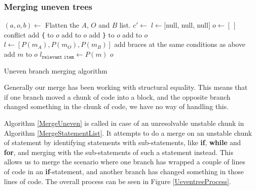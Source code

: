 \documentclass[11pt]{article}
\begin{document}
\subsubsection{Merging uneven trees}
\label{MergingUnevenSection}

\begin{algorithm}
\begin{algorithmic}
    \State $(a, o, b) \gets $ Flatten the $A$, $O$ and $B$ list.
    \State $c' \gets$ 
    \State $l \gets $[null, null, null$]$
    \State $o \gets [\,]$
        	        \State \Return conflict
				\EndIf
                	    \State add \texttt{\{} to $o$
    	            \EndIf
            	        \State add  to $o$
                    		\State add \texttt{\}} to $o$
	                    \EndIf
    	            \EndIf
				\EndIf
            	\State add  to $o$
            	\State $l \gets [P(m_A), P(m_O), P(m_B)]$
			\EndFor
        		\State add braces at the same conditions as above
	        	\State add $m$ to $o$
	        	\State $l_\texttt{relevant item} \gets P(m)$
			\EndFor    	    
        \EndIf
   \EndFor
   \State \Return $o$
\EndFunction
\end{algorithmic}
\caption{Uneven branch merging algorithm}
\label{MergeUneven}
\end{algorithm}

Generally our merge has been working with structural equality. This means that if one branch moved a chunk of code into a block, and the opposite branch changed something in the chunk of code, we have no way of handling this.

Algorithm \ref{MergeUneven} is called in case of an unresolvable unstable chunk in Algorithm \ref{MergeStatementList}. It attempts to do a merge on an unstable chunk of statement by identifying statements with sub-statements, like \textbf{if}, \textbf{while} and \textbf{for}, and merging with the sub-statements of such a statement instead. This allows us to merge the scenario where one branch has wrapped a couple of lines of code in an \textbf{if}-statement, and another branch has changed something in those lines of code. The overall process can be seen in Figure \ref{UeventreeProcess}. 
\end{document}
